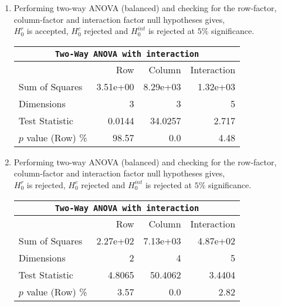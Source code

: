 \begin{enumerate}
\begin{table}[H]
		\bigskip
	\end{table}
	
	\item Performing two-way ANOVA (balanced) and checking for the row-factor, column-factor and interaction factor null hypotheses gives,\\
	$ H_0^r $ is accepted, $ H_0^c $ rejected and $ H_0^{int} $ is rejected at $ 5\% $ significance.\\
	
	\begin{table}[H]
		\centering
		\begin{tabular}{@{}lrrr@{}}
			\toprule
			\multicolumn{4}{c}{\texttt{Two-Way ANOVA with interaction}}\\ 
			\midrule
			{} &       Row &    Column & Interaction \\
			\midrule
			Sum of Squares     &  3.51e+00 &  8.29e+03 &    1.32e+03 \\
			Dimensions         &         3 &         3 &           5 \\
			Test Statistic     &    0.0144 &   34.0257 &       2.717 \\
			$p$ value (Row) \% &     98.57 &       0.0 &        4.48 \\
			\bottomrule
		\end{tabular}
		
		\bigskip
	\end{table}

	\item Performing two-way ANOVA (balanced) and checking for the row-factor, column-factor and interaction factor null hypotheses gives,\\
	$ H_0^r $ is rejected, $ H_0^c $ rejected and $ H_0^{int} $ is rejected at $ 5\% $ significance.\\
	
	\begin{table}[H]
		\centering
		\begin{tabular}{@{}lrrr@{}}
			\toprule
			\multicolumn{4}{c}{\texttt{Two-Way ANOVA with interaction}}\\ 
			\midrule
			{} &       Row &    Column & Interaction \\
			\midrule
			Sum of Squares     &  2.27e+02 &  7.13e+03 &    4.87e+02 \\
			Dimensions         &         2 &         4 &           5 \\
			Test Statistic     &    4.8065 &   50.4062 &      3.4404 \\
			$p$ value (Row) \% &      3.57 &       0.0 &        2.82 \\
			\bottomrule
		\end{tabular}
		

\end{table}
\end{enumerate}
